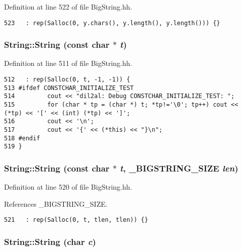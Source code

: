 Definition at line 522 of file Big\-String.hh.



\footnotesize\begin{verbatim}523   : rep(Salloc(0, y.chars(), y.length(), y.length())) {}
\end{verbatim}\normalsize 
{}
\subsubsection{\setlength{\rightskip}{0pt plus 5cm}String::String (const char $\ast$ {\em t})\hspace{0.3cm}{\tt  [inline]}}\label{classString_a3}




Definition at line 511 of file Big\-String.hh.



\footnotesize\begin{verbatim}512   : rep(Salloc(0, t, -1, -1)) {
513 #ifdef CONSTCHAR_INITIALIZE_TEST
514         cout << "dil2al: Debug CONSTCHAR_INITIALIZE_TEST: ";
515         for (char * tp = (char *) t; *tp!='\0'; tp++) cout << (*tp) << '[' << (int) (*tp) << ']';
516         cout << '\n';
517         cout << '{' << (*this) << "}\n";
518 #endif
519 }
\end{verbatim}\normalsize 
{}
\subsubsection{\setlength{\rightskip}{0pt plus 5cm}String::String (const char $\ast$ {\em t}, {\bf \_\-BIGSTRING\_\-SIZE} {\em len})\hspace{0.3cm}{\tt  [inline]}}\label{classString_a4}




Definition at line 520 of file Big\-String.hh.

References \_\-BIGSTRING\_\-SIZE.



\footnotesize\begin{verbatim}521   : rep(Salloc(0, t, tlen, tlen)) {}
\end{verbatim}\normalsize 
{}
\subsubsection{\setlength{\rightskip}{0pt plus 5cm}String::String (char {\em c})\hspace{0.3cm}{\tt  [inline]}}\label{classString_a5}




